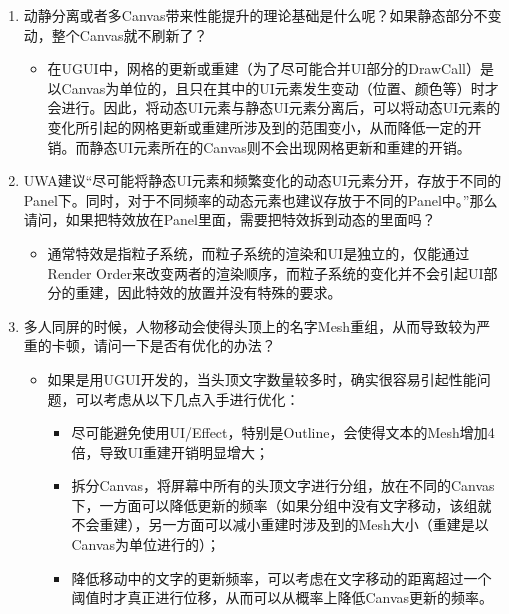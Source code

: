 \documentclass[9pt, b5paper]{article}
\begin{document}
\begin{enumerate}
\begin{itemize}
\end{itemize}
\item 动静分离或者多Canvas带来性能提升的理论基础是什么呢？如果静态部分不变动，整个Canvas就不刷新了？
\label{sec:orgc1ee292}
\begin{itemize}
\item 在UGUI中，网格的更新或重建（为了尽可能合并UI部分的DrawCall）是以Canvas为单位的，且只在其中的UI元素发生变动（位置、颜色等）时才会进行。因此，将动态UI元素与静态UI元素分离后，可以将动态UI元素的变化所引起的网格更新或重建所涉及到的范围变小，从而降低一定的开销。而静态UI元素所在的Canvas则不会出现网格更新和重建的开销。
\end{itemize}
\item UWA建议“尽可能将静态UI元素和频繁变化的动态UI元素分开，存放于不同的Panel下。同时，对于不同频率的动态元素也建议存放于不同的Panel中。”那么请问，如果把特效放在Panel里面，需要把特效拆到动态的里面吗？
\label{sec:org53f83ec}
\begin{itemize}
\item 通常特效是指粒子系统，而粒子系统的渲染和UI是独立的，仅能通过Render Order来改变两者的渲染顺序，而粒子系统的变化并不会引起UI部分的重建，因此特效的放置并没有特殊的要求。
\end{itemize}
\item 多人同屏的时候，人物移动会使得头顶上的名字Mesh重组，从而导致较为严重的卡顿，请问一下是否有优化的办法？
\label{sec:orgce6ea85}
\begin{itemize}
\item 如果是用UGUI开发的，当头顶文字数量较多时，确实很容易引起性能问题，可以考虑从以下几点入手进行优化：
\begin{itemize}
\item 尽可能避免使用UI/Effect，特别是Outline，会使得文本的Mesh增加4倍，导致UI重建开销明显增大；
\item 拆分Canvas，将屏幕中所有的头顶文字进行分组，放在不同的Canvas下，一方面可以降低更新的频率（如果分组中没有文字移动，该组就不会重建），另一方面可以减小重建时涉及到的Mesh大小（重建是以Canvas为单位进行的）；
\item 降低移动中的文字的更新频率，可以考虑在文字移动的距离超过一个阈值时才真正进行位移，从而可以从概率上降低Canvas更新的频率。
\end{itemize}
\end{itemize}
\end{enumerate}
\end{document}
